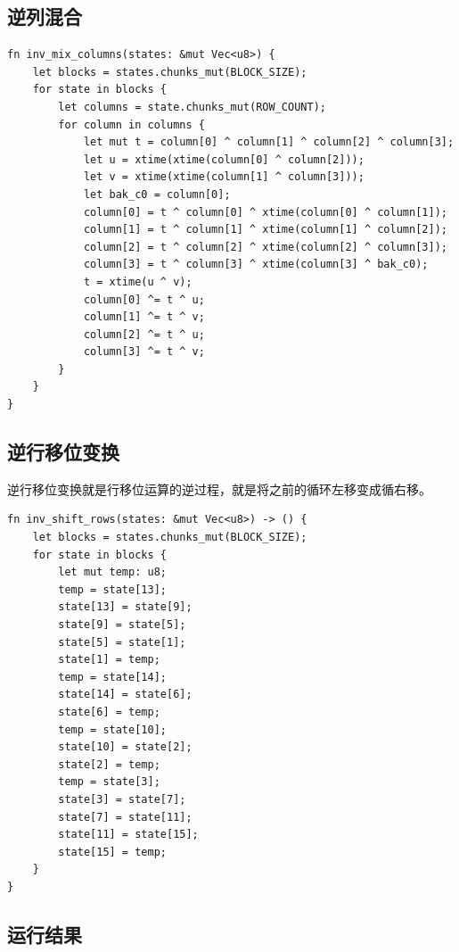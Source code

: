 \documentclass[degree=project,degree-type=project,cjk-font=noto]{thuthesis}
\begin{document}
\subsection{逆列混合}

  \begin{verbatim}
fn inv_mix_columns(states: &mut Vec<u8>) {
    let blocks = states.chunks_mut(BLOCK_SIZE);
    for state in blocks {
        let columns = state.chunks_mut(ROW_COUNT);
        for column in columns {
            let mut t = column[0] ^ column[1] ^ column[2] ^ column[3];
            let u = xtime(xtime(column[0] ^ column[2]));
            let v = xtime(xtime(column[1] ^ column[3]));
            let bak_c0 = column[0];
            column[0] = t ^ column[0] ^ xtime(column[0] ^ column[1]);
            column[1] = t ^ column[1] ^ xtime(column[1] ^ column[2]);
            column[2] = t ^ column[2] ^ xtime(column[2] ^ column[3]);
            column[3] = t ^ column[3] ^ xtime(column[3] ^ bak_c0);
            t = xtime(u ^ v);
            column[0] ^= t ^ u;
            column[1] ^= t ^ v;
            column[2] ^= t ^ u;
            column[3] ^= t ^ v;
        }
    }
}
  \end{verbatim}


\subsection{逆行移位变换}

逆行移位变换就是行移位运算的逆过程，就是将之前的循环左移变成循右移。

  \begin{verbatim}
fn inv_shift_rows(states: &mut Vec<u8>) -> () {
    let blocks = states.chunks_mut(BLOCK_SIZE);
    for state in blocks {
        let mut temp: u8;
        temp = state[13];
        state[13] = state[9];
        state[9] = state[5];
        state[5] = state[1];
        state[1] = temp;
        temp = state[14];
        state[14] = state[6];
        state[6] = temp;
        temp = state[10];
        state[10] = state[2];
        state[2] = temp;
        temp = state[3];
        state[3] = state[7];
        state[7] = state[11];
        state[11] = state[15];
        state[15] = temp;
    }
}
  \end{verbatim}

\subsection{运行结果}
\end{document}
